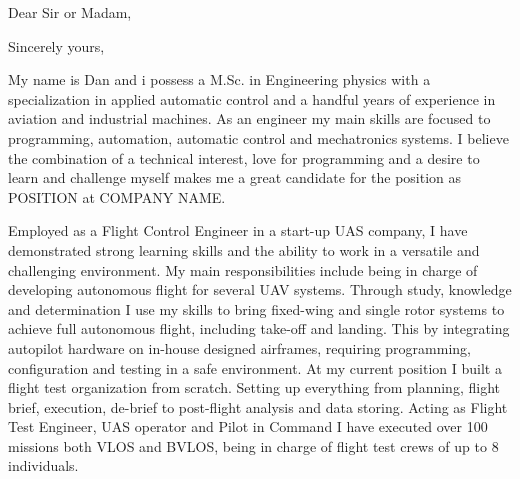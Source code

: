 \documentclass[11pt,a4paper,sans]{moderncv} %
\begin{document}
%
%



\clearpage

\date{\today} %
\opening{Dear Sir or Madam,} %
\closing{Sincerely yours,} %

\makelettertitle %

My name is Dan and i possess a M.Sc. in Engineering physics with a specialization in applied automatic control and a handful years of experience in aviation and industrial machines.
As an engineer my main skills are focused to programming, automation, automatic control and mechatronics systems.
I believe the combination of a technical interest, love for programming and a desire to learn and challenge myself makes me a great candidate for the position as POSITION at COMPANY NAME.


Employed as a Flight Control Engineer in a start-up UAS company, I have demonstrated strong learning skills and the ability to work in a versatile and challenging environment. 
My main responsibilities include being in charge of developing autonomous flight for several UAV systems. 
Through study, knowledge and determination I use my skills to bring fixed-wing and single rotor systems to achieve full autonomous flight, including take-off and landing. 
This by integrating autopilot hardware on in-house designed airframes, requiring programming, configuration and testing in a safe environment.
\newline
At my current position I built a flight test organization from scratch. 
Setting up everything from planning, flight brief, execution, de-brief to post-flight analysis and data storing. Acting as Flight Test Engineer, UAS operator and Pilot in Command I have executed over 100 missions both VLOS and BVLOS, being in charge of flight test crews of up to 8 individuals.
\end{document}
